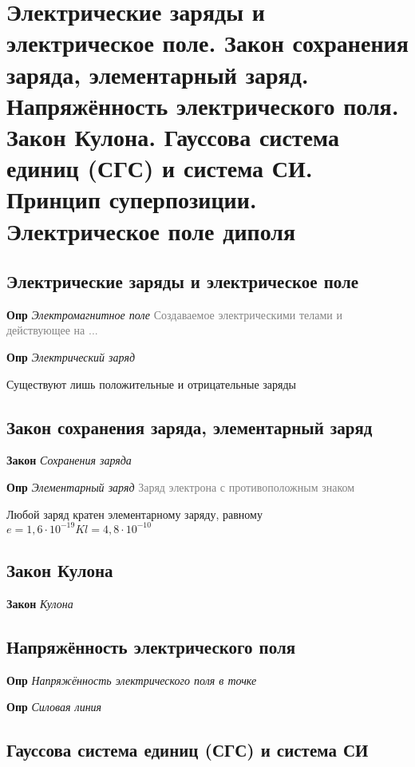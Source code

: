 \documentclass[a4paper, 14pt]{article}
\begin{document}
    
    \tableofcontents \newpage
    
    \section{Электрические заряды и электрическое поле.
    Закон сохранения заряда, элементарный заряд.
    Напряжённость электрического поля.
    Закон Кулона.
    Гауссова система единиц (СГС) и система СИ.
    Принцип суперпозиции.
    Электрическое поле диполя}
    
    \subsection{Электрические заряды и электрическое поле}
    
    \textbf{Опр} \textit{Электромагнитное поле} \textcolor{gray}{Создаваемое электрическими телами и действующее на ...}
    
    \textbf{Опр} \textit{Электрический заряд}
    
    Существуют лишь положительные и отрицательные заряды
    
    \subsection{Закон сохранения заряда, элементарный заряд}
    
    \textbf{Закон} \textit{Сохранения заряда}
    
    \textbf{Опр} \textit{Элементарный заряд} \textcolor{gray}{Заряд электрона с противоположным знаком}
    
    Любой заряд кратен элементарному заряду, равному $e = 1,6 \cdot 10^{-19} Kl = 4,8 \cdot 10^{-10}$
    
    \subsection{Закон Кулона}
    
    \textbf{Закон} \textit{Кулона}
    
    \subsection{Напряжённость электрического поля}
    
    \textbf{Опр} \textit{Напряжённость электрического поля в точке}
    
    \textbf{Опр} \textit{Силовая линия}
    
    \subsection{Гауссова система единиц (СГС) и система СИ}
    
\end{document}
